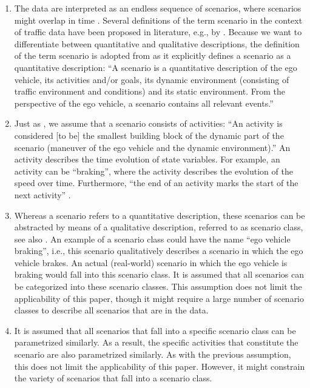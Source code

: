 \begin{enumerate}
	\item The data are interpreted as an endless sequence of scenarios, where scenarios might overlap in time \cite{elrofai2018scenario}. Several definitions of the term scenario in the context of traffic data have been proposed in literature, e.g., by \textcite{geyer2014, ulbrich2015, elrofai2016scenario, elrofai2018scenario}. Because we want to differentiate between quantitative and qualitative descriptions, the definition of the term scenario is adopted from \textcite{elrofai2018scenario} as it explicitly defines a scenario as a quantitative description: ``A scenario is a quantitative description of the ego vehicle, its activities and/or goals, its dynamic environment (consisting of traffic environment and conditions) and its static environment. From the perspective of the ego vehicle, a scenario contains all relevant events.''
	
	\item Just as \textcite{elrofai2018scenario}, we assume that a scenario consists of activities: ``An activity is considered [to be] the smallest building block of the dynamic part of the scenario (maneuver of the ego vehicle and the dynamic environment).'' An activity describes the time evolution of state variables. For example, an activity can be ``braking'', where the activity describes the evolution of the speed over time. Furthermore, ``the end of an activity marks the start of the next activity'' \cite{elrofai2018scenario}.
	
	\item Whereas a scenario refers to a quantitative description, these scenarios can be abstracted by means of a qualitative description, referred to as scenario class, see also \textcite{ploeg2018cetran, elrofai2018scenario}. An example of a scenario class could have the name ``ego vehicle braking'', i.e., this scenario qualitatively describes a scenario in which the ego vehicle brakes. An actual (real-world) scenario in which the ego vehicle is braking would fall into this scenario class. It is assumed that all scenarios can be categorized into these scenario classes. This assumption does not limit the applicability of this paper, though it might require a large number of scenario classes to describe all scenarios that are in the data.
	
	\item It is assumed that all scenarios that fall into a specific scenario class can be parametrized similarly. As a result, the specific activities that constitute the scenario are also parametrized similarly. As with the previous assumption, this does not limit the applicability of this paper. However, it might constrain the variety of scenarios that fall into a scenario class. 
\end{enumerate}

